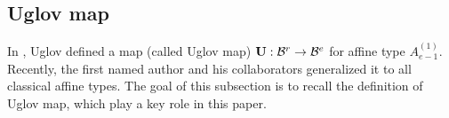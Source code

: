 \documentclass[11pt]{amsart}
\theoremstyle{plain}
\numberwithin{equation}{subsection}
\newtheorem{definition}[theorem]{Definition}
\begin{document}

\medskip


\subsection{Uglov map}
In \cite{U}, Uglov defined a map (called Uglov map) ${\rm\bf U}: \mathcal{B}^r\rightarrow \mathcal{B}^e$ for affine type $A_{e-1}^{(1)}$.
Recently, the first named author and his collaborators \cite{HLQ} generalized it to all classical affine types.
The goal of this subsection is to recall the definition of Uglov map, which play a key role in this paper.
\end{document}
